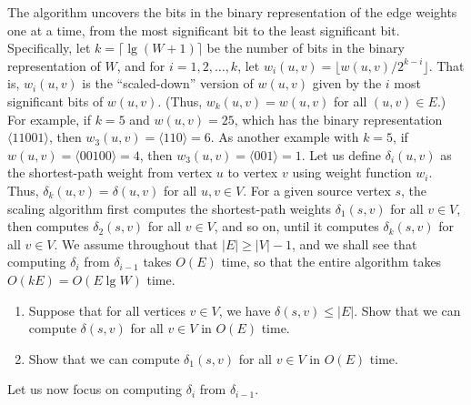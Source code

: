 \documentclass{../../class}
\begin{document}
The algorithm uncovers the bits in the binary representation of the edge weights one at a time, from the most significant bit to the least significant bit. Specifically, let $k = \lceil \lg{(W+1)} \rceil $ be the number of bits in the binary representation of $W$, and for $i = 1, 2, \dots, k$, let $w_i(u, v) = \lfloor w(u, v) / 2^{k-i} \rfloor $. That is, $w_i(u, v)$ is the \enquote{scaled-down} version of $w(u, v)$ given by the $i$ most significant bits of $w(u, v)$. (Thus, $w_k(u, v) = w(u, v)$ for all $(u, v)\in E$.) For example, if $k = 5$ and $w(u, v) = 25$, which has the binary representation $\langle 11001 \rangle $, then $w_3(u, v) = \langle 110 \rangle = 6$. As another example with $k = 5$, if $w(u, v) = \langle 00100 \rangle = 4$, then $w_3(u, v) = \langle 001 \rangle = 1$. Let us define $\delta_i(u, v)$ as the shortest-path weight from vertex $u$ to vertex $v$ using weight function $w_i$. Thus, $\delta_k(u, v) = \delta(u, v)$ for all $u, v\in V$. For a given source vertex $s$, the scaling algorithm first computes the shortest-path weights $\delta_1(s, v)$ for all $v\in V$, then computes $\delta_2(s, v)$ for all $v\in V$, and so on, until it computes $\delta_k(s, v)$ for all $v\in V$. We assume throughout that $|E| \geq |V| - 1$, and we shall see that computing $\delta_i$ from $\delta_{i-1}$ takes $O(E)$ time, so that the entire algorithm takes $O(kE) = O(E\lg{W})$ time.
\begin{enumerate}
    \item Suppose that for all vertices $v\in V$, we have $\delta(s, v) \leq |E|$. Show that we can compute $\delta(s, v)$ for all $v\in V$ in $O(E)$ time.
    \item Show that we can compute $\delta_1(s, v)$ for all $v\in V$ in $O(E)$ time.
\end{enumerate}
Let us now focus on computing $\delta_i$ from $\delta_{i-1}$.
\end{document}
